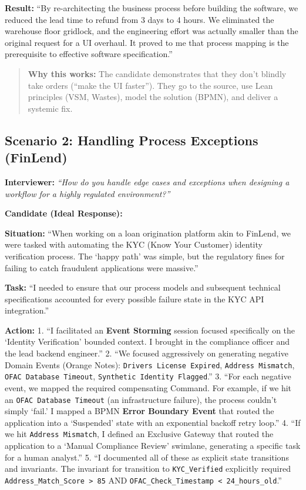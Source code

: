 \textbf{Result:} ``By re-architecting the business process before
building the software, we reduced the lead time to refund from 3 days to
4 hours. We eliminated the warehouse floor gridlock, and the engineering
effort was actually smaller than the original request for a UI overhaul.
It proved to me that process mapping is the prerequisite to effective
software specification.''

\begin{quote}
\textbf{Why this works:} The candidate demonstrates that they don't
blindly take orders (``make the UI faster''). They go to the source, use
Lean principles (VSM, Wastes), model the solution (BPMN), and deliver a
systemic fix.
\end{quote}

\subsection{Scenario 2: Handling Process Exceptions
(FinLend)}\label{scenario-2-handling-process-exceptions-finlend}

\textbf{Interviewer:} \emph{``How do you handle edge cases and
exceptions when designing a workflow for a highly regulated
environment?''}

\textbf{Candidate (Ideal Response):}

\textbf{Situation:} ``When working on a loan origination platform akin
to FinLend, we were tasked with automating the KYC (Know Your Customer)
identity verification process. The `happy path' was simple, but the
regulatory fines for failing to catch fraudulent applications were
massive.''

\textbf{Task:} ``I needed to ensure that our process models and
subsequent technical specifications accounted for every possible failure
state in the KYC API integration.''

\textbf{Action:} 1. ``I facilitated an \textbf{Event Storming} session
focused specifically on the `Identity Verification' bounded context. I
brought in the compliance officer and the lead backend engineer.'' 2.
``We focused aggressively on generating negative Domain Events (Orange
Notes): \texttt{Driver\textquotesingle{}s\ License\ Expired},
\texttt{Address\ Mismatch}, \texttt{OFAC\ Database\ Timeout},
\texttt{Synthetic\ Identity\ Flagged}.'' 3. ``For each negative event,
we mapped the required compensating Command. For example, if we hit an
\texttt{OFAC\ Database\ Timeout} (an infrastructure failure), the
process couldn't simply `fail.' I mapped a BPMN \textbf{Error Boundary
Event} that routed the application into a `Suspended' state with an
exponential backoff retry loop.'' 4. ``If we hit
\texttt{Address\ Mismatch}, I defined an Exclusive Gateway that routed
the application to a `Manual Compliance Review' swimlane, generating a
specific task for a human analyst.'' 5. ``I documented all of these as
explicit state transitions and invariants. The invariant for transition
to \texttt{KYC\_Verified} explicitly required
\texttt{Address\_Match\_Score\ \textgreater{}\ 85} AND
\texttt{OFAC\_Check\_Timestamp\ \textless{}\ 24\_hours\_old}.''


